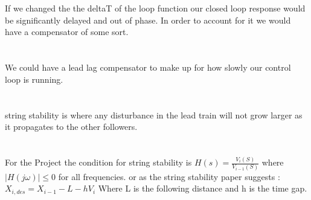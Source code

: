 \documentclass[11pt,english]{article}
\begin{document}
\section{}
If we changed the the deltaT of the loop function our closed loop response would be significantly delayed and out of phase. In order to account for it we would have a compensator of some sort.
\section{}
We could have a lead lag compensator to make up for how slowly our control loop is running. 
\section{} 
string stability is where any disturbance in the lead train will not grow larger as it propagates to the other followers. 
\section{}
For the Project the condition for string stability is 
$H(s) = \frac{V_i(S)}{V_{i-1}(S)} $ 
where 
$|H(j\omega)| \leq 0 $ for all frequencies. 
or as the string stability paper suggests : 
$X_{i,des} = X_{i-1} - L - hV_i $ 
Where L is the following distance and h is the time gap. 
\end{document}
